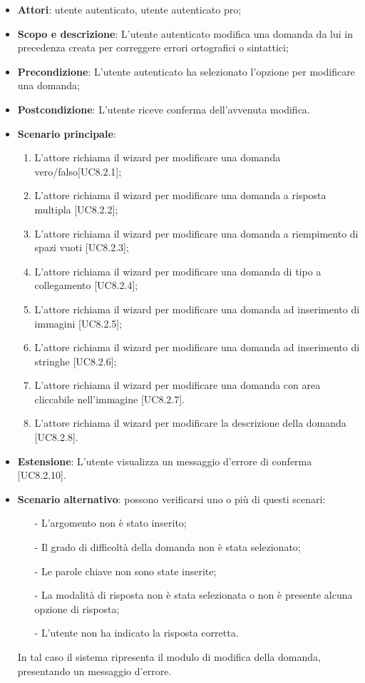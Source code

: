 	\begin{itemize}
		\item
			\textbf{Attori}: utente autenticato, utente autenticato pro;
		\item		
			\textbf{Scopo e descrizione}: L'utente autenticato modifica una domanda da lui in precedenza creata per correggere errori ortografici o sintattici;
		\item
			\textbf{Precondizione}: L'utente autenticato ha selezionato l'opzione per modificare una domanda;
		\item
			\textbf{	Postcondizione}: L'utente riceve conferma dell'avvenuta modifica.
		\item
			\textbf{Scenario principale}:
	       		\begin{enumerate}
					\item
					L'attore richiama il wizard per modificare una domanda vero/falso[UC8.2.1];
					\item
					L'attore richiama il wizard per modificare una domanda a risposta multipla [UC8.2.2];
					\item
					L'attore richiama il wizard per modificare una domanda a riempimento di spazi vuoti [UC8.2.3];
					\item
					L'attore richiama il wizard per modificare una domanda di tipo a collegamento [UC8.2.4];
					\item
					L'attore richiama il wizard per modificare una domanda ad inserimento di immagini [UC8.2.5];
					\item
					L'attore richiama il wizard per modificare una domanda ad inserimento di stringhe [UC8.2.6];
					\item
					L'attore richiama il wizard per modificare una domanda con area cliccabile nell'immagine [UC8.2.7].
					\item
					L'attore richiama il wizard per modificare la descrizione della domanda [UC8.2.8].
	 			\end{enumerate}
	 	\item
			\textbf{Estensione}: L'utente visualizza un messaggio d'errore di conferma [UC8.2.10].
	 	\item
	 		\textbf{Scenario alternativo}: possono verificarsi uno o più di questi scenari:
				\begin{itemize}
					\item[-] 	
						L'argomento non è stato inserito;
					\item[-] 
    						Il grado di difficoltà della domanda non è stata selezionato;
					\item[-] 
						Le parole chiave non sono state inserite;
					\item[-] 
						La modalità di risposta non è stata selezionata o non è presente alcuna opzione di risposta; 
					\item[-]
						L'utente non ha indicato la risposta corretta.	
				\end{itemize}
			In tal caso il sistema ripresenta il modulo di modifica della domanda, presentando un messaggio d'errore.
	\end{itemize}

